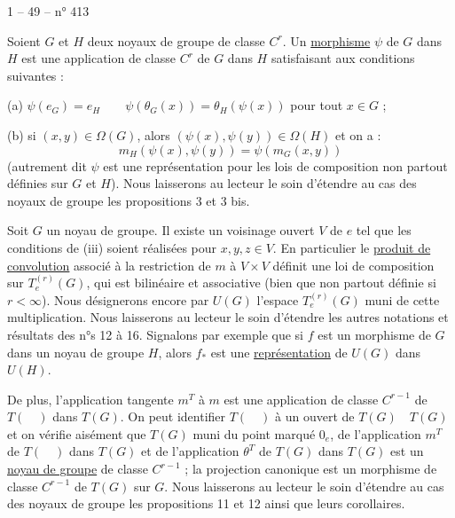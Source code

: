 1 -- 49 -- \hfill n° 413

Soient $G$ et $H$ deux noyaux de groupe de classe $C^r$. Un \uline{morphisme} $\psi$ de $G$
dans $H$ est une application de classe $C^r$ de $G$ dans $H$ satisfaisant aux conditions
suivantes :

(a) $\psi(e_G)=e_H\qquad \psi(\theta_G(x))=\theta_H(\psi(x))$ pour tout $x\in G$ ;

(b) si $(x,y)\in\Omega(G)$, alors $(\psi(x),\psi(y))\in\Omega(H)$ et on a :
\[
m_H(\psi(x),\psi(y))=\psi(m_G(x,y))
\]
(autrement dit $\psi$ est une représentation pour les lois de composition non partout
définies sur $G$ et $H$). Nous laisserons au lecteur le soin d'étendre au cas des
noyaux de groupe les propositions 3 et 3 bis.

Soit $G$ un noyau de groupe. Il existe un voisinage ouvert $V$ de $e$ tel que les
conditions de (iii) soient réalisées pour $x,y,z\in V$. En particulier le \uline{produit de
convolution} associé à la restriction de $m$ à $V\times V$ définit une loi de composition
sur $T_e^{(r)}(G)$, qui est bilinéaire et associative (bien que non partout définie
si $r<\infty$). Nous désignerons encore par $U(G)$ l'espace $T_e^{(r)}(G)$ muni de cette multiplication.
Nous laisserons au lecteur le soin d'étendre les autres notations et
résultats des n°s 12 à 16. Signalons par exemple que si $f$ est un morphisme de $G$
dans un noyau de groupe $H$, alors $f_*$ est une \uline{représentation} de $U(G)$ dans $U(H)$.

De plus, l'application tangente $m^T$ à $m$ est une application de classe $C^{r-1}$
de $T(\quad)$ dans $T(G)$. On peut identifier $T(\quad)$ à un ouvert de $T(G)\quad T(G)$ et on
vérifie aisément que $T(G)$ muni du point marqué $0_e$, de l'application $m^T$ de $T(\quad)$
dans $T(G)$ et de l'application $\theta^T$ de $T(G)$ dans $T(G)$ est un \uline{noyau de groupe} de
classe $C^{r-1}$ ; la projection canonique est un morphisme de classe $C^{r-1}$ de $T(G)$
sur $G$. Nous laisserons au lecteur le soin d'étendre au cas des noyaux de groupe
les propositions 11 et 12 ainsi que leurs corollaires.

